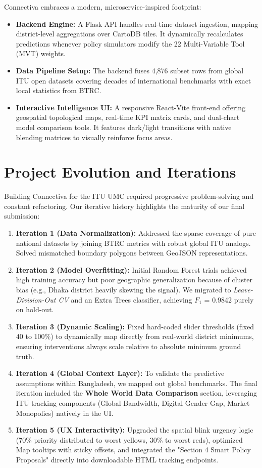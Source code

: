 \documentclass[11pt,a4paper]{article}
\begin{document}
Connectiva embraces a modern, microservice-inspired footprint:
\begin{itemize}
    \item \textbf{Backend Engine:} A Flask API handles real-time dataset ingestion, mapping district-level aggregations over CartoDB tiles. It dynamically recalculates predictions whenever policy simulators modify the 22 Multi-Variable Tool (MVT) weights.
    \item \textbf{Data Pipeline Setup:} The backend fuses 4,876 subset rows from global ITU open datasets covering decades of international benchmarks with exact local statistics from BTRC.
    \item \textbf{Interactive Intelligence UI:} A responsive React-Vite front-end offering geospatial topological maps, real-time KPI matrix cards, and dual-chart model comparison tools. It features dark/light transitions with native blending matrices to visually reinforce focus areas.
\end{itemize}

\section{Project Evolution and Iterations}

Building Connectiva for the ITU UMC required progressive problem-solving and constant refactoring. Our iterative history highlights the maturity of our final submission:

\begin{enumerate}
    \item \textbf{Iteration 1 (Data Normalization):} Addressed the sparse coverage of pure national datasets by joining BTRC metrics with robust global ITU analogs. Solved mismatched boundary polygons between GeoJSON representations.
    \item \textbf{Iteration 2 (Model Overfitting):} Initial Random Forest trials achieved high training accuracy but poor geographic generalization because of cluster bias (e.g., Dhaka district heavily skewing the signal). We migrated to \textit{Leave-Division-Out CV} and an Extra Trees classifier, achieving $F_1$ = 0.9842 purely on hold-out.
    \item \textbf{Iteration 3 (Dynamic Scaling):} Fixed hard-coded slider thresholds (fixed $40$ to $100\%$) to dynamically map directly from real-world district minimums, ensuring interventions always scale relative to absolute minimum ground truth.
    \item \textbf{Iteration 4 (Global Context Layer):} To validate the predictive assumptions within Bangladesh, we mapped out global benchmarks. The final iteration included the \textbf{Whole World Data Comparison} section, leveraging ITU tracking components (Global Bandwidth, Digital Gender Gap, Market Monopolies) natively in the UI.
    \item \textbf{Iteration 5 (UX Interactivity):} Upgraded the spatial blink urgency logic (70\% priority distributed to worst yellows, 30\% to worst reds), optimized Map tooltips with sticky offsets, and integrated the "Section 4 Smart Policy Proposals" directly into downloadable HTML tracking endpoints.
\end{enumerate}
\end{document}
